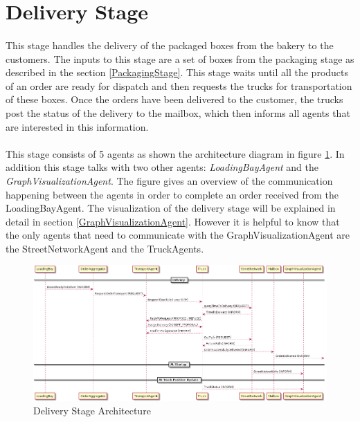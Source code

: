 \documentclass[11pt, a4paper]{article}
\begin{document}
\newpage
\section{Delivery Stage}\label{DeliveryStage}
\paragraph{}
This stage handles the delivery of the packaged boxes from the bakery to the customers. The inputs to this stage are a set of boxes from the packaging stage as described in the section \ref{PackagingStage}. This stage waits until all the products of an order are ready for dispatch and then requests the trucks for transportation of these boxes. Once the orders have been delivered to the customer, the trucks post the status of the delivery to the mailbox, which then informs all agents that are interested in this information.

\paragraph{}
This stage consists of 5 agents as shown the architecture diagram in figure \ref{DeliveryArchitecture}. In addition this stage talks with two other agents: \textit{LoadingBayAgent} and the \textit{GraphVisualizationAgent}. The figure gives an overview of the communication happening between the agents in order to complete an order received from the LoadingBayAgent. The visualization of the delivery stage will be explained in detail in section \ref{GraphVisualizationAgent}. However it is helpful to know that the only agents that need to communicate with the GraphVisualizationAgent are the StreetNetworkAgent and the TruckAgents. 

\begin{figure}[h!]
	\centering
	\includegraphics[width=\textwidth]{../Architecture/Architecture_Delivery.png}
	\caption{Delivery Stage Architecture}
	\label{DeliveryArchitecture}
\end{figure}
\end{document}
